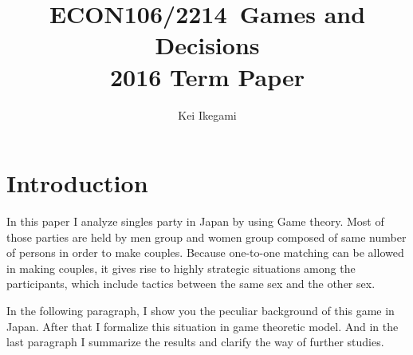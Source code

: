 \documentclass{article}
\begin{document}
\title{ECON106/2214\ Games and Decisions\\ 2016 Term Paper}
\author{Kei Ikegami}
\maketitle

\section{Introduction}
\par
In this paper I analyze singles party in Japan by using Game theory. Most of those parties are held by men group and women group composed of same number of persons in order to make couples. Because one-to-one matching can be allowed in making couples, it gives rise to highly strategic situations among the participants, which include tactics between the same sex and the other sex.
\par
In the following paragraph, I show you the peculiar background of this game in Japan. After that I formalize this situation in game theoretic model. And in the last paragraph I summarize the results and clarify the way of further studies.
\end{document}

